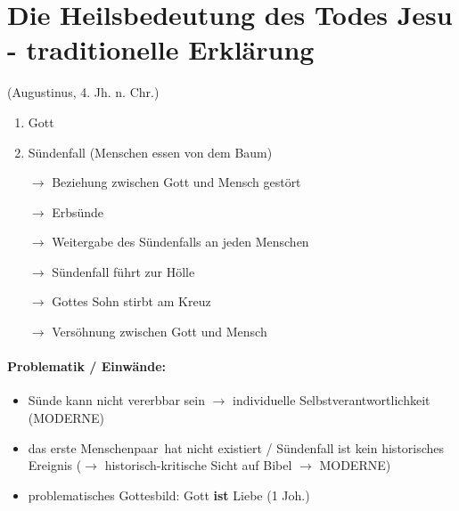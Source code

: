 \documentclass[12pt,a4paper]{report}
\begin{document}
	\section{Die Heilsbedeutung des Todes Jesu - traditionelle Erklärung}
	(Augustinus, 4. Jh. n. Chr.) \\
	\begin{enumerate}
		\item Gott
		\item Sündenfall (Menschen essen von dem Baum)
		\item[$\to$]Beziehung zwischen Gott und Mensch gestört
		\item[$\to$]\dq Erbsünde\dq
		\item[$\to$] Weitergabe des Sündenfalls an jeden Menschen
		\item[$\to$] Sündenfall führt zur Hölle 
		\item[$\to$] Gottes Sohn stirbt am Kreuz
		\item[$\to$] Versöhnung zwischen Gott und Mensch
	\end{enumerate}
	\paragraph{Problematik / Einwände:}
	\begin{itemize}
		\item Sünde kann nicht vererbbar sein $\to$ individuelle Selbstverantwortlichkeit (MODERNE)
		\item das \dq erste Menschenpaar\dq\ hat nicht existiert / Sündenfall ist kein historisches Ereignis ($\to$ historisch-kritische Sicht auf Bibel $\to$ MODERNE)
		\item problematisches Gottesbild: Gott \textbf{ist} Liebe (1 Joh.)
	\end{itemize}
\end{document}
